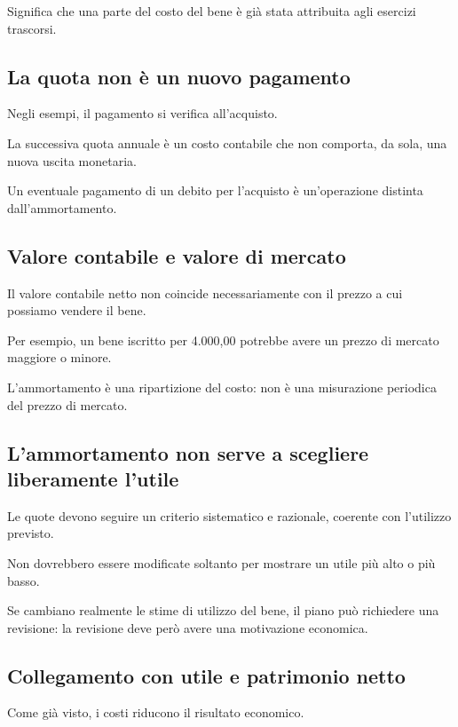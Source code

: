\noindent Significa che una parte
del costo del bene
è già stata attribuita
agli esercizi trascorsi.


\subsection{La quota non è un nuovo pagamento}

\noindent Negli esempi,
il pagamento si verifica all'acquisto.

\noindent La successiva quota annuale
è un costo contabile
che non comporta, da sola,
una nuova uscita monetaria.

\noindent Un eventuale pagamento
di un debito per l'acquisto
è un'operazione distinta
dall'ammortamento.


\subsection{Valore contabile e valore di mercato}

\noindent Il valore contabile netto
non coincide necessariamente
con il prezzo a cui possiamo vendere il bene.

\noindent Per esempio,
un bene iscritto per 4.000,00
potrebbe avere un prezzo di mercato
maggiore o minore.

\noindent L'ammortamento è
una ripartizione del costo:
non è una misurazione periodica
del prezzo di mercato.


\subsection{L'ammortamento non serve
a scegliere liberamente l'utile}

\noindent Le quote devono seguire
un criterio sistematico e razionale,
coerente con l'utilizzo previsto.

\noindent Non dovrebbero essere modificate
soltanto per mostrare
un utile più alto o più basso.

\noindent Se cambiano realmente
le stime di utilizzo del bene,
il piano può richiedere una revisione:
la revisione deve però avere
una motivazione economica.


\subsection{Collegamento con utile e patrimonio netto}

\noindent Come già visto,
i costi riducono il risultato economico.

